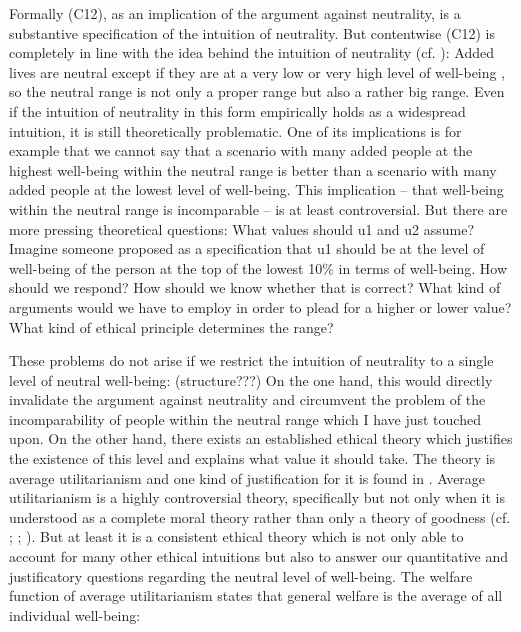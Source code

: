Formally (C12), as an implication of the argument against neutrality, is a substantive specification of the intuition of neutrality. But contentwise (C12) is completely in line with the idea behind the intuition of neutrality (cf. ): Added lives are neutral except if they are at a very low or very high level of well-being \cite[p.~172]{broome_2012}, so the neutral range is not only a proper range but also a rather big range.  
Even if the intuition of neutrality in this form empirically holds as a widespread intuition, it is still theoretically problematic. One of its implications is for example that we cannot say that a scenario with many added people at the highest well-being within the neutral range is better than a scenario with many added people at the lowest level of well-being. This implication – that well-being within the neutral range is incomparable – is at least controversial. But there are more pressing theoretical questions: What values should u1 and u2 assume? Imagine someone proposed as a specification that u1 should be at the level of well-being of the person at the top of the lowest 10\% in terms of well-being. How should we respond? How should we know whether that is correct? What kind of arguments would we have to employ in order to plead for a higher or lower value? What kind of ethical principle determines the range? 

These problems do not arise if we restrict the intuition of neutrality to a single level of neutral well-being: (structure???) On the one hand, this would directly invalidate the argument against neutrality and circumvent the problem of the incomparability of people within the neutral range which I have just touched upon. On the other hand, there exists an established ethical theory which justifies the existence of this level and explains what value it should take. The theory is average utilitarianism and one kind of justification for it is found in \cite{harsanyi_1955}. Average utilitarianism is a highly controversial theory, specifically but not only when it is understood as a complete moral theory rather than only a theory of goodness (cf. ; ; ). But at least it is a consistent ethical theory which is not only able to account for many other ethical intuitions but also to answer our quantitative and justificatory questions regarding the neutral level of well-being. The welfare function of average utilitarianism states that general welfare is the average of all individual well-being: 

